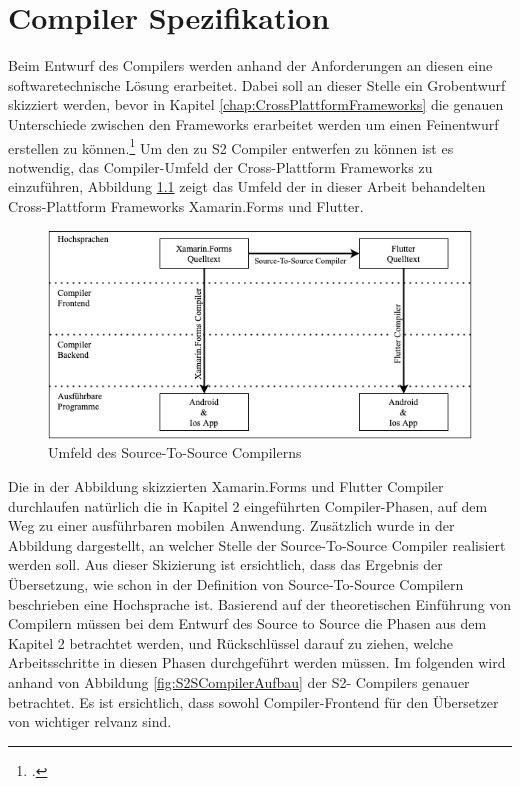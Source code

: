 \chapter{Compiler Spezifikation}
\label{chap:CompilerEntwurf}
Beim Entwurf des Compilers werden anhand der Anforderungen an diesen eine softwaretechnische Lösung erarbeitet.  Dabei soll an dieser Stelle ein Grobentwurf skizziert werden, bevor in Kapitel \ref{chap:CrossPlattformFrameworks} die genauen Unterschiede zwischen den Frameworks erarbeitet werden um einen Feinentwurf erstellen zu können.\footcite[Vgl.][S.6]{Balzert2011}
Um den zu S2 Compiler entwerfen zu können ist es notwendig,  das Compiler-Umfeld der Cross-Plattform Frameworks zu einzuführen, Abbildung \ref{fig:CompilerArchitecture} zeigt das Umfeld der in dieser Arbeit behandelten Cross-Plattform Frameworks Xamarin.Forms und Flutter.

\begin{figure}[!ht]
 \includegraphics[width=14.5cm]{Images/CompilerArchitecture/CompilerStructure.png}
 \caption{Umfeld des Source-To-Source Compilerns}
 \label{fig:CompilerArchitecture}
\end{figure}

Die in der Abbildung skizzierten Xamarin.Forms und Flutter Compiler durchlaufen natürlich die in Kapitel 2 eingeführten Compiler-Phasen, auf dem Weg zu einer ausführbaren mobilen Anwendung.  Zusätzlich wurde in der Abbildung dargestellt,  an welcher Stelle der Source-To-Source Compiler realisiert werden soll.  Aus dieser Skizierung ist ersichtlich, dass das Ergebnis der Übersetzung, wie schon in der Definition von Source-To-Source Compilern beschrieben eine Hochsprache ist.  
Basierend auf der theoretischen Einführung von Compilern müssen bei dem Entwurf des Source to Source die Phasen aus dem Kapitel 2 betrachtet werden,  und Rückschlüssel darauf zu ziehen,  welche Arbeitsschritte in diesen Phasen durchgeführt werden müssen. Im folgenden wird anhand von Abbildung  \ref{fig:S2SCompilerAufbau} der S2- Compilers genauer betrachtet. Es ist ersichtlich,  dass sowohl Compiler-Frontend für den Übersetzer von wichtiger relvanz sind. 

